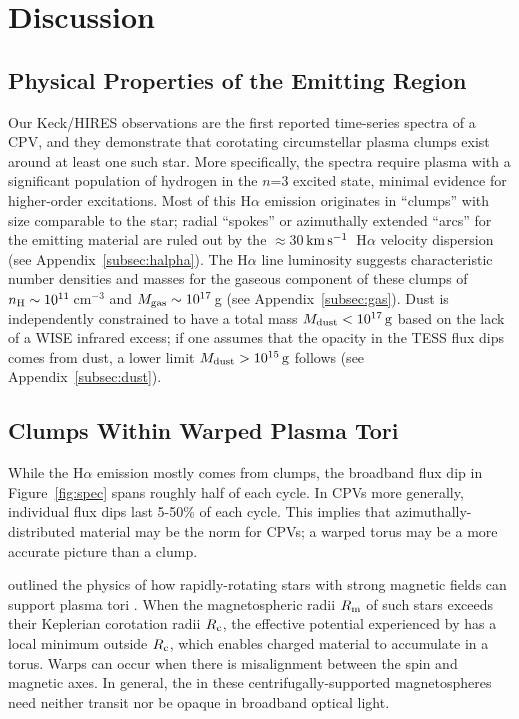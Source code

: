\documentclass[11pt,twocolumn,tighten]{aastex7}
\newcommand{\kms}{\ensuremath{\rm km\,s^{-1}}}
\begin{document}
\section{Discussion}
\label{sec:disc}

\subsection{Physical Properties of the Emitting Region}


Our Keck/HIRES observations are the first reported time-series spectra
of a CPV, and they demonstrate that corotating circumstellar plasma
clumps exist around at least one such star.  More specifically, the
spectra require plasma with a significant population of hydrogen in
the $n$=3 excited state, minimal evidence for
higher-order excitations.  Most of this H$\alpha$ emission originates
in ``clumps'' with size comparable to the star; radial ``spokes'' or
azimuthally extended ``arcs'' for the emitting material are ruled out
by the $\approx$30\,\kms\ H$\alpha$ velocity dispersion (see
Appendix~\ref{subsec:halpha}).  The H$\alpha$ line luminosity suggests
characteristic number densities and masses for the gaseous component
of these clumps of $n_{\rm H} \sim 10^{11}$\,cm$^{-3}$ and $M_{\rm
gas} \sim 10^{17}$\,g (see Appendix~\ref{subsec:gas}).  Dust is
independently constrained to have a total mass $M_{\rm dust} <
10^{17}\,{\rm g}$ based on the lack of a WISE infrared excess; if one
assumes that the opacity in the TESS flux dips comes from dust, a
lower limit $M_{\rm dust} > 10^{15}\,{\rm g}$ follows (see
Appendix~\ref{subsec:dust}).  


\subsection{Clumps Within Warped Plasma Tori}

While the H$\alpha$ emission mostly comes from clumps, the broadband
flux dip in Figure~\ref{fig:spec} spans roughly half of each cycle.
In CPVs more generally, individual flux dips last 5-50\% of each
cycle\citep{Bouma2024}.  This implies that azimuthally-distributed
material may be the norm for CPVs; a warped torus may be a more
accurate picture than a clump.

\citet{Townsend2005} outlined the physics of how rapidly-rotating
stars with strong magnetic fields can support plasma tori
.  When
the magnetospheric radii $R_{\rm m}$ of such stars exceeds their
Keplerian corotation radii $R_{\rm c}$, the effective potential experienced by has a local minimum outside $R_{\rm c}$, which
enables charged material to accumulate in a torus.  Warps can occur
when there is misalignment between the spin and magnetic axes.  In
general, the in these centrifugally-supported
magnetospheres need
neither transit nor be opaque in broadband optical light.  
\end{document}
